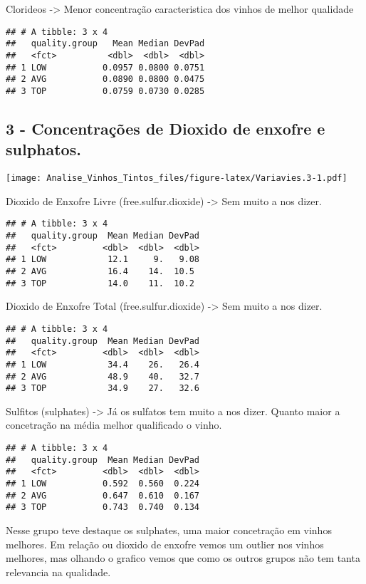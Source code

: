 \documentclass[]{article}
\begin{document}
Clorideos -\textgreater{} Menor concentração caracteristica dos vinhos
de melhor qualidade

\begin{verbatim}
## # A tibble: 3 x 4
##   quality.group   Mean Median DevPad
##   <fct>          <dbl>  <dbl>  <dbl>
## 1 LOW           0.0957 0.0800 0.0751
## 2 AVG           0.0890 0.0800 0.0475
## 3 TOP           0.0759 0.0730 0.0285
\end{verbatim}

\hypertarget{concentracoes-de-dioxido-de-enxofre-e-sulphatos.}{%
\subsection{3 - Concentrações de Dioxido de enxofre e
sulphatos.}\label{concentracoes-de-dioxido-de-enxofre-e-sulphatos.}}

\texttt{[image: Analise\_Vinhos\_Tintos\_files/figure-latex/Variavies.3-1.pdf]}

Dioxido de Enxofre Livre (free.sulfur.dioxide) -\textgreater{} Sem muito
a nos dizer.

\begin{verbatim}
## # A tibble: 3 x 4
##   quality.group  Mean Median DevPad
##   <fct>         <dbl>  <dbl>  <dbl>
## 1 LOW            12.1     9.   9.08
## 2 AVG            16.4    14.  10.5 
## 3 TOP            14.0    11.  10.2
\end{verbatim}

Dioxido de Enxofre Total (free.sulfur.dioxide) -\textgreater{} Sem muito
a nos dizer.

\begin{verbatim}
## # A tibble: 3 x 4
##   quality.group  Mean Median DevPad
##   <fct>         <dbl>  <dbl>  <dbl>
## 1 LOW            34.4    26.   26.4
## 2 AVG            48.9    40.   32.7
## 3 TOP            34.9    27.   32.6
\end{verbatim}

Sulfitos (sulphates) -\textgreater{} Já os sulfatos tem muito a nos
dizer. Quanto maior a concetração na média melhor qualificado o vinho.

\begin{verbatim}
## # A tibble: 3 x 4
##   quality.group  Mean Median DevPad
##   <fct>         <dbl>  <dbl>  <dbl>
## 1 LOW           0.592  0.560  0.224
## 2 AVG           0.647  0.610  0.167
## 3 TOP           0.743  0.740  0.134
\end{verbatim}

Nesse grupo teve destaque os sulphates, uma maior concetração em vinhos
melhores. Em relação ou dioxido de enxofre vemos um outlier nos vinhos
melhores, mas olhando o grafico vemos que como os outros grupos não tem
tanta relevancia na qualidade.
\end{document}
